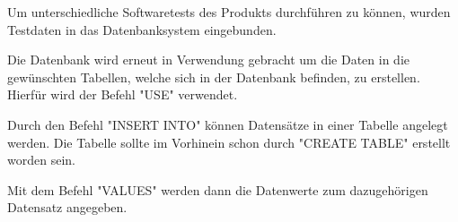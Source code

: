 
Um unterschiedliche Softwaretests des Produkts durchführen zu können, wurden Testdaten in das Datenbanksystem eingebunden.

Die Datenbank wird erneut in Verwendung gebracht um die Daten in die gewünschten Tabellen, welche sich in der Datenbank befinden, zu erstellen. Hierfür wird der Befehl "USE" verwendet.


Durch den Befehl "INSERT INTO" können Datensätze in einer Tabelle angelegt werden. Die Tabelle sollte im Vorhinein schon durch "CREATE TABLE" erstellt worden sein.


Mit dem Befehl "VALUES" werden dann die Datenwerte zum dazugehörigen Datensatz angegeben.



